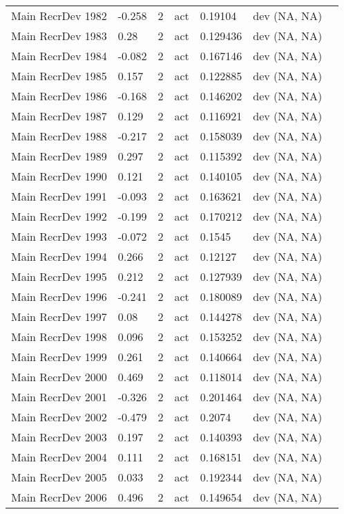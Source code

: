 \documentclass[11pt,
  english,
  letterpaper,
]{article}
\begin{document}
\begin{landscape}
\begin{longtable}[t]{>{\raggedright\arraybackslash}p{6cm}lllll>{\raggedright\arraybackslash}p{4cm}}
Main RecrDev 1982 & -0.258 & 2 & act & 0.19104 & dev (NA, NA)\\
Main RecrDev 1983 & 0.28 & 2 & act & 0.129436 & dev (NA, NA)\\
Main RecrDev 1984 & -0.082 & 2 & act & 0.167146 & dev (NA, NA)\\
Main RecrDev 1985 & 0.157 & 2 & act & 0.122885 & dev (NA, NA)\\
Main RecrDev 1986 & -0.168 & 2 & act & 0.146202 & dev (NA, NA)\\
Main RecrDev 1987 & 0.129 & 2 & act & 0.116921 & dev (NA, NA)\\
Main RecrDev 1988 & -0.217 & 2 & act & 0.158039 & dev (NA, NA)\\
Main RecrDev 1989 & 0.297 & 2 & act & 0.115392 & dev (NA, NA)\\
Main RecrDev 1990 & 0.121 & 2 & act & 0.140105 & dev (NA, NA)\\
Main RecrDev 1991 & -0.093 & 2 & act & 0.163621 & dev (NA, NA)\\
Main RecrDev 1992 & -0.199 & 2 & act & 0.170212 & dev (NA, NA)\\
Main RecrDev 1993 & -0.072 & 2 & act & 0.1545 & dev (NA, NA)\\
Main RecrDev 1994 & 0.266 & 2 & act & 0.12127 & dev (NA, NA)\\
Main RecrDev 1995 & 0.212 & 2 & act & 0.127939 & dev (NA, NA)\\
Main RecrDev 1996 & -0.241 & 2 & act & 0.180089 & dev (NA, NA)\\
Main RecrDev 1997 & 0.08 & 2 & act & 0.144278 & dev (NA, NA)\\
Main RecrDev 1998 & 0.096 & 2 & act & 0.153252 & dev (NA, NA)\\
Main RecrDev 1999 & 0.261 & 2 & act & 0.140664 & dev (NA, NA)\\
Main RecrDev 2000 & 0.469 & 2 & act & 0.118014 & dev (NA, NA)\\
Main RecrDev 2001 & -0.326 & 2 & act & 0.201464 & dev (NA, NA)\\
Main RecrDev 2002 & -0.479 & 2 & act & 0.2074 & dev (NA, NA)\\
Main RecrDev 2003 & 0.197 & 2 & act & 0.140393 & dev (NA, NA)\\
Main RecrDev 2004 & 0.111 & 2 & act & 0.168151 & dev (NA, NA)\\
Main RecrDev 2005 & 0.033 & 2 & act & 0.192344 & dev (NA, NA)\\
Main RecrDev 2006 & 0.496 & 2 & act & 0.149654 & dev (NA, NA)\\

\end{longtable}
\end{landscape}
\end{document}
